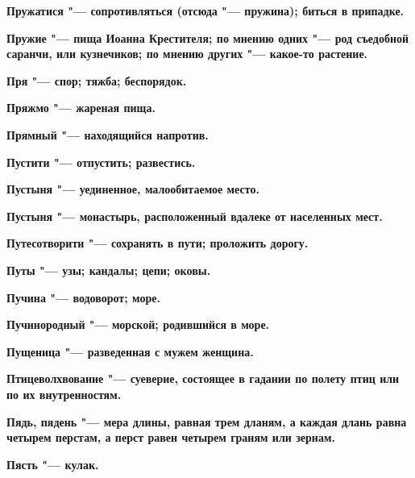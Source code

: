 \bfseries Пружатися \normalfont{} "--- сопротивляться (отсюда "--- пружина); биться в припадке. 




\bfseries Пружие \normalfont{} "--- пища Иоанна Крестителя; по мнению одних "--- род съедобной саранчи, или кузнечиков; по мнению других "--- какое-то растение. 




\bfseries Пря \normalfont{} "--- спор; тяжба; беспорядок. 




\bfseries Пряжмо \normalfont{} "--- жареная пища. 




\bfseries Прямный \normalfont{} "--- находящийся напротив. 




\bfseries Пустити \normalfont{} "--- отпустить; развестись. 




\bfseries Пустыня \normalfont{} "--- уединенное, малообитаемое место. 




\bfseries Пустыня \normalfont{} "--- монастырь, расположенный вдалеке от населенных мест. 




\bfseries Путесотворити \normalfont{} "--- сохранять в пути; проложить дорогу. 




\bfseries Путы \normalfont{} "--- узы; кандалы; цепи; оковы. 




\bfseries Пучина \normalfont{} "--- водоворот; море. 




\bfseries Пучинородный \normalfont{} "--- морской; родившийся в море. 




\bfseries Пущеница \normalfont{} "--- разведенная с мужем женщина. 




\bfseries Птицеволхвование \normalfont{} "--- суеверие, состоящее в гадании по полету птиц или по их внутренностям. 




\bfseries Пядь, пядень \normalfont{} "--- мера длины, равная трем дланям, а каждая длань равна четырем перстам, а перст равен четырем граням или зернам. 




\bfseries Пясть \normalfont{} "--- кулак. 





